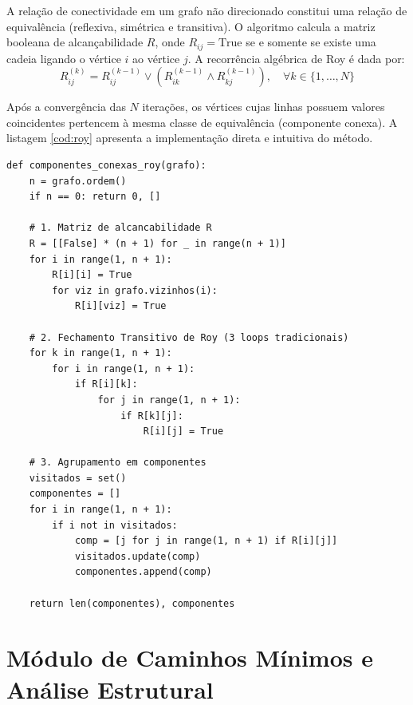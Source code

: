\documentclass[12pt,a4paper]{article}
\begin{document}
A relação de conectividade em um grafo não direcionado constitui uma relação de equivalência (reflexiva, simétrica e transitiva). O algoritmo calcula a matriz booleana de alcançabilidade $R$, onde $R_{ij} = \text{True}$ se e somente se existe uma cadeia ligando o vértice $i$ ao vértice $j$. A recorrência algébrica de Roy é dada por:
\begin{equation}
    R^{(k)}_{ij} = R^{(k-1)}_{ij} \lor \left( R^{(k-1)}_{ik} \land R^{(k-1)}_{kj} \right), \quad \forall k \in \{1, \dots, N\}
\end{equation}

Após a convergência das $N$ iterações, os vértices cujas linhas possuem valores coincidentes pertencem à mesma classe de equivalência (componente conexa). A listagem \ref{cod:roy} apresenta a implementação direta e intuitiva do método.

\begin{lstlisting}[caption={Algoritmo de Roy para Componentes Conexas}, label={cod:roy}]
def componentes_conexas_roy(grafo):
    n = grafo.ordem()
    if n == 0: return 0, []

    # 1. Matriz de alcancabilidade R
    R = [[False] * (n + 1) for _ in range(n + 1)]
    for i in range(1, n + 1):
        R[i][i] = True
        for viz in grafo.vizinhos(i):
            R[i][viz] = True

    # 2. Fechamento Transitivo de Roy (3 loops tradicionais)
    for k in range(1, n + 1):
        for i in range(1, n + 1):
            if R[i][k]:
                for j in range(1, n + 1):
                    if R[k][j]:
                        R[i][j] = True

    # 3. Agrupamento em componentes
    visitados = set()
    componentes = []
    for i in range(1, n + 1):
        if i not in visitados:
            comp = [j for j in range(1, n + 1) if R[i][j]]
            visitados.update(comp)
            componentes.append(comp)

    return len(componentes), componentes
\end{lstlisting}

\section{Módulo de Caminhos Mínimos e Análise Estrutural}
\end{document}
